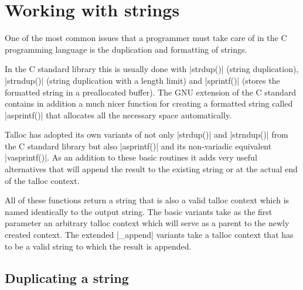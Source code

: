 \section{Working with strings}
\label{talloc:sec:strings}

One of the most common issues that a programmer must take care of in the C
programming language is the duplication and formatting of strings.

In the C standard library this is usually done with |strdup()| (string
duplication), |strndup()| (string duplication with a length limit) and
|sprintf()| (stores the formatted string in a preallocated buffer). The GNU
extension of the C standard contains in addition a much nicer function for
creating a formatted string called |asprintf()| that allocates all the necessary
space automatically.

Talloc has adopted its own variants of not only |strdup()| and |strndup()| from
the C standard library but also |asprintf()| and its non-variadic equivalent
|vasprintf()|. As an addition to these basic routines it adds very useful
alternatives that will append the result to the existing string or at the
actual end of the talloc context.

All of these functions return a string that is also a valid talloc context
which is named identically to the output string. The basic variants take as
the first parameter an arbitrary talloc context which will serve as a parent to
the newly created context. The extended |_append| variants take a talloc context
that has to be a valid string to which the result is appended.

\newpage
\subsection{Duplicating a string}

